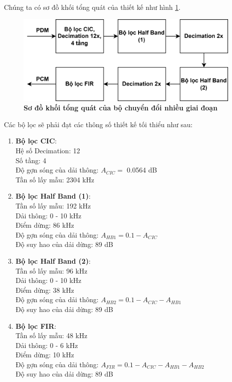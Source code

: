 Chúng ta có sơ đồ khối tổng quát của thiết kế như hình \ref{pipeline_new}.
\begin{figure}[H]
    \centering
    \includegraphics[width=11cm]{Images/Chuong3/pipeline_new_top.png}
    \caption[Sơ đồ khối tổng quát của bộ chuyển đổi nhiều giai đoạn]{\bfseries \fontsize{12pt}{0pt}\selectfont Sơ đồ khối tổng quát của bộ chuyển đổi nhiều giai đoạn}
    \label{pipeline_new}
\end{figure}
 \noindent Các bộ lọc sẽ phải đạt các thông số thiết kế tối thiểu như sau:
\begin{enumerate}
    \item \textbf{Bộ lọc CIC}: \\
    Hệ số Decimation: 12\\
    Số tầng: 4\\
    Độ gợn sóng của dải thông: $A_{CIC} =$ 0.0564 dB\\
    Tần số lấy mẫu: 2304 kHz
    \item \textbf{Bộ lọc Half Band (1)}:\\
    Tần số lấy mẫu: 192 kHz\\
    Dải thông: 0 - 10 kHz\\
    Điểm dừng: 86 kHz\\
    Độ gợn sóng của dải thông: $A_{HB1} = 0.1 - A_{CIC}$\\
    Độ suy hao của dải dừng: 89 dB
    \item \textbf{Bộ lọc Half Band (2)}:\\
    Tần số lấy mẫu: 96 kHz\\
    Dải thông: 0 - 10 kHz\\
    Điểm dừng: 38 kHz\\
    Độ gợn sóng của dải thông: $A_{HB2} = 0.1 - A_{CIC} - A_{HB1}$\\
    Độ suy hao của dải dừng: 89 dB
    \item \textbf{Bộ lọc FIR}:\\
    Tần số lấy mẫu: 48 kHz\\
    Dải thông: 0 - 6 kHz\\
    Điểm dừng: 10 kHz\\
    Độ gợn sóng của dải thông: $A_{FIR} = 0.1 - A_{CIC} - A_{HB1} - A_{HB2}$\\
    Độ suy hao của dải dừng: 89 dB
\end{enumerate}

